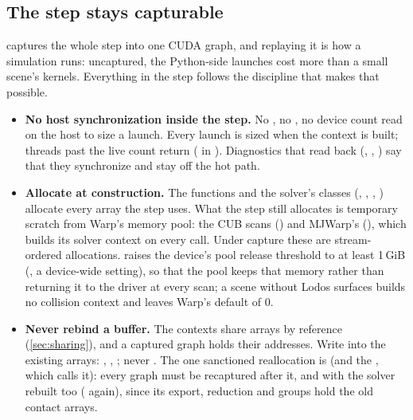 \subsection{The step stays capturable}\label{sec:graph}

 captures the whole step into one CUDA graph, and replaying it is how a simulation runs: uncaptured, the Python-side launches cost more than a small scene's kernels. Everything in the step follows the discipline that makes that possible.

\begin{itemize}
\item \textbf{No host synchronization inside the step.} No , no , no device count read on the host to size a launch. Every launch is sized when the context is built; threads past the live count return ( in ). Diagnostics that read back (, , ) say that they synchronize and stay off the hot path.
\item \textbf{Allocate at construction.} The  functions and the solver's classes (, , , ) allocate every array the step uses. What the step still allocates is temporary scratch from Warp's memory pool: the CUB scans () and MJWarp's  (), which builds its solver context on every call. Under capture these are stream-ordered allocations.  raises the device's pool release threshold to at least 1\,GiB (, a device-wide setting), so that the pool keeps that memory rather than returning it to the driver at every scan; a scene without Lodos surfaces builds no collision context and leaves Warp's default of 0.
\item \textbf{Never rebind a buffer.} The contexts share arrays by reference (\cref{sec:sharing}), and a captured graph holds their addresses. Write into the existing arrays: , , ; never . The one sanctioned reallocation is  (and the , which calls it): every graph must be recaptured after it, and with  the solver rebuilt too ( again), since its export, reduction and groups hold the old contact arrays.

\end{itemize}
